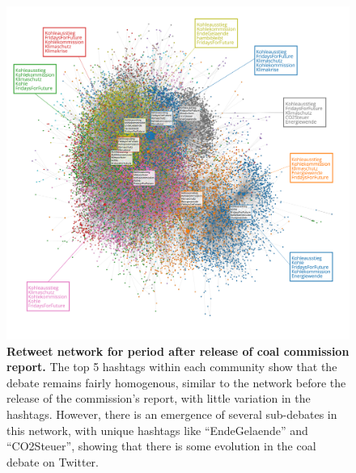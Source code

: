 \documentclass[12pt,onecolumn,twoside]{layout}
\begin{document}
\begin{figure}
	\begin{center}
		\includegraphics[width=\linewidth]{figures/rt_network_ht_period3_v3}
	\end{center}
	\caption{\textbf{Retweet network for period after release of coal commission report.} The top 5 hashtags within each community show that the debate remains fairly homogenous, similar to the network before the release of the commission's report, with little variation in the hashtags. However, there is an emergence of several sub-debates in this network, with unique hashtags like ``EndeGelaende'' and ``CO2Steuer'', showing that there is some evolution in the coal debate on Twitter.}
	\label{fig:rt_network_aft}
\end{figure}
\end{document}
